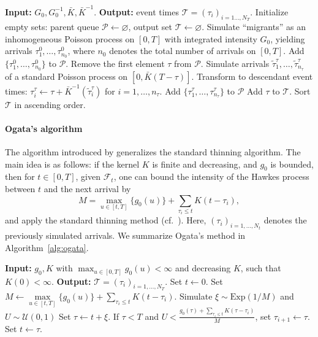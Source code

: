 \documentclass{article}
\newcommand{\1}{\mathbbm{1}}
\numberwithin{equation}{section}
\begin{document}
\begin{algorithm}[H]
\caption{\textbf{Population approach}}\label{alg:population}
\begin{algorithmic}[1]
\State \textbf{Input:} $G_0, G_0^{-1}, \bar K, \bar K^{-1}$.
\State \textbf{Output:} event times $\mathcal{T} = (\tau_i)_{i=1\ldots, N_T}$.
\State Initialize empty sets: parent queue $\mathcal{P} \gets \varnothing$, output set $\mathcal{T} \gets \varnothing$.
\State Simulate ``migrants'' as an inhomogeneous Poisson process on $[0,T]$ with integrated intensity $G_0$, yielding arrivals $\tau_1^0, \ldots, \tau_{n_0}^0$, where $n_0$ denotes the total number of arrivals on $[0, T]$.
\State Add $\{\tau_1^0, \ldots, \tau_{n_0}^0\}$ to $\mathcal{P}$.
    \State Remove the first element $\tau$ from $\mathcal{P}$.
    \State Simulate arrivals $\tilde\tau_1^\tau, \ldots, \tilde\tau_{n_\tau}^\tau$ of a standard Poisson process on $[0, \bar K(T-\tau)]$.
    \State Transform to descendant event times: $\tau_i^\tau \gets \tau + \bar K^{-1}(\tilde\tau_i^\tau)$ for $i = 1,\ldots,n_\tau$.
    \State Add $\{\tau_1^\tau, \ldots, \tau_{n_\tau}^\tau\}$ to $\mathcal{P}$
    \State Add $\tau$ to $\mathcal{T}$.
\EndWhile
\State Sort $\mathcal{T}$ in ascending order.
\end{algorithmic}
\end{algorithm}


\paragraph{Ogata's algorithm}
The algorithm introduced by \citet{Ogata81} generalizes the standard thinning algorithm. The main idea is as follows: if the kernel $K$ is finite and decreasing, and $g_0$ is bounded, then for $t \in [0, T]$, given $\mathcal{F}_t$, one can bound the intensity of the Hawkes process between $t$ and the next arrival by
\[
M = \max\limits_{u \in [t, T]} \{g_0(u)\} + \sum\limits_{\tau_i \leq t} K(t - \tau_i),
\]
and apply the standard thinning method (cf.~\citet{Lewis1979}). Here, $(\tau_i)_{i = 1, \ldots, N_t}$ denotes the previously simulated arrivals. We summarize Ogata's method in Algorithm~\ref{alg:ogata}. 

\begin{algorithm}[H]
\caption{ \textbf{- Ogata's algorithm}}\label{alg:ogata}
\begin{algorithmic}[1]
\State \textbf{Input:} \(g_0, K\) with $\max_{u \in [0, T]}g_0(u) < \infty$ and decreasing $K$, such that $K(0) < \infty$.
\State \textbf{Output:} \(\mathcal{T} = (\tau_i)_{i = 1, \ldots, N_T}\).
\State Set $t \gets 0$.
\State Set $M \gets \max\limits_{u \in [t, T]} \{g_0(u)\} + \sum\limits_{\tau_i \leq t} K(t - \tau_i)$.
\State Simulate $\xi \sim \mathrm{Exp}(1 / M)$ and $U \sim \mathcal{U}(0, 1)$
\State Set $\tau \gets t + \xi$.
\State If $\tau < T$ and $U < \frac{g_0(\tau) + \sum_{\tau_i \leq t} K(\tau - \tau_i)}{M}$, set $\tau_{i+1} \gets \tau$.
\State Set $t \gets \tau$.
\EndWhile
\end{algorithmic}
\end{algorithm}
\end{document}
